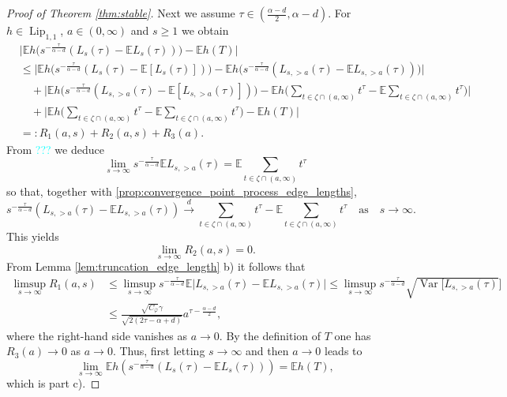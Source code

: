 \documentclass{article}
\theoremstyle{definition}
\numberwithin{equation}{section}
\theoremstyle{remark}
\begin{document}
\begin{proof}[Proof of Theorem \ref{thm:stable}]
Next we assume $\tau\in(\frac{\alpha-d}{2},\alpha-d)$. For $h\in\operatorname{Lip}_{1,1}$, $a\in(0,\infty)$ and $s\geq 1$ we obtain
\begin{align*}
& \big| \mathbb{E} h\big(s^{-\frac{\tau}{\alpha-d}}(L_s(\tau)-\mathbb{E}L_s(\tau))\big)  - \mathbb{E} h(T)\big| \\
& \leq \big| \mathbb{E} h\big(s^{-\frac{\tau}{\alpha-d}}(L_s(\tau)-\mathbb{E}[L_s(\tau)])\big) - \mathbb{E} h\big(s^{-\frac{\tau}{\alpha-d}}(L_{s,>a}(\tau)-\mathbb{E}L_{s,>a}(\tau))\big) \big| \\
& \quad + \bigg| \mathbb{E} h\big(s^{-\frac{\tau}{\alpha-d}}(L_{s,>a}(\tau)-\mathbb{E}[L_{s,>a}(\tau)])\big) - \mathbb{E} h\bigg( \sum_{t\in \zeta\cap(a,\infty)} t^\tau - \mathbb{E} \sum_{t\in \zeta\cap(a,\infty)} t^\tau \bigg) \bigg| \\
& \quad + \bigg| \mathbb{E} h\bigg( \sum_{t\in \zeta\cap(a,\infty)} t^\tau - \mathbb{E} \sum_{t\in \zeta\cap(a,\infty)} t^\tau \bigg)  - \mathbb{E} h(T)\bigg| \\
& =: R_1(a,s) + R_2(a,s) + R_3(a).
\end{align*}
From \textcolor{cyan}{???} we deduce
$$
\lim_{s\to\infty} s^{-\frac{\tau}{\alpha-d}} \mathbb{E}L_{s,>a}(\tau) = \mathbb{E} \sum_{t\in \zeta\cap(a,\infty)} t^\tau
$$
so that, together with \eqref{prop:convergence_point_process_edge_lengths},
$$
s^{-\frac{\tau}{\alpha-d}}(L_{s,>a}(\tau)-\mathbb{E}L_{s,>a}(\tau)) \overset{d}{\longrightarrow} \sum_{t\in \zeta\cap(a,\infty)} t^\tau - \mathbb{E} \sum_{t\in \zeta\cap(a,\infty)} t^\tau \quad \text{as} \quad s\to\infty.
$$
This yields
$$
\lim_{s\to\infty} R_2(a,s) =0.
$$
From Lemma \ref{lem:truncation_edge_length} b) it follows that
\begin{align*}
\limsup_{s\to\infty} R_1(a,s) & \leq \limsup_{s\to\infty} s^{-\frac{\tau}{\alpha-d}} \mathbb{E} \big| L_{s,>a}(\tau) - \mathbb{E} L_{s,>a}(\tau) \big| \leq \limsup_{s\to\infty} s^{-\frac{\tau}{\alpha-d}} \sqrt{\operatorname{Var}[L_{s,>a}(\tau) }]   \\
& \leq \frac{\sqrt{C_{\bar{\varphi}}}\gamma }{\sqrt{2(2\tau-\alpha+d)}} a^{\tau-\frac{\alpha-d}{2}},
\end{align*}
where the right-hand side vanishes as $a\to0$. By the definition of $T$ one has $R_3(a)\to0$ as $a\to 0$. Thus, first letting $s\to\infty$ and then $a\to 0$ leads to
$$
\lim_{s\to\infty} \mathbb{E} h(s^{-\frac{\tau}{\alpha-d}}(L_s(\tau)-\mathbb{E}L_s(\tau)))  = \mathbb{E} h(T),
$$
which is part c).


\end{proof}
\end{document}
